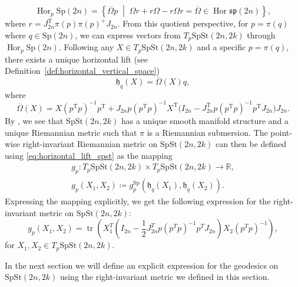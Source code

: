 %
\begin{equation*}
\operatorname{Hor}_{p}\mathrm{Sp}(2n)=\left\{ \overline{\Omega}p\;\middle|\;\Omega r+r\Omega-r\Omega r=\overline{\Omega}\in \operatorname{Hor}\mathfrak{sp}(2n) \right\},
\end{equation*}
%
where $r=J_{2n}^{\mathrm{T}}\pi(p)\pi (p)^+J_{2n}$. From this quotient perspective, for $p=\pi(q)$ where $q\in \mathrm{Sp}(2n)$, we can express vectors from $T_{p}\mathrm{SpSt}(2n, 2k)$ through $\operatorname{Hor}_{p}\mathrm{Sp}(2n)$. Following \cite[p.~5]{JensenZimmermann2024} any $X\in T_{p}\mathrm{SpSt}(2n, 2k)$ and a specific $p=\pi (q)$, there exists a unique horizontal lift (see Definition~\ref{def:horizontal_vertical_space})
%
\begin{equation}\label{eq:horizontal_lift_spst}
    \mathfrak{h}_{q}(X)=\overline{\Omega}(X)q,
\end{equation}
where
\begin{equation}\label{eq:bar_omega}
    \overline{\Omega}(X)=X(p^{\mathrm{T}}p)^{-1}p^{\mathrm{T}}+J_{2n}p(p^{\mathrm{T}}p)^{-1}X^{\mathrm{T}}\big(I_{2n}-J_{2n}^{\mathrm{T}}p(p^{\mathrm{T}}p)^{-1}p^{\mathrm{T}}J_{2n}\big)J_{2n}.
\end{equation}
%
By \cite[Thm.~2.28]{Lee2018}, we see that $\mathrm{SpSt}(2n, 2k)$ has a unique smooth manifold structure and a unique Riemannian metric such that $\pi$ is a Riemannian submersion. The point-wise right-invariant Riemannian metric on $\mathrm{SpSt}(2n, 2k)$ can then be defined using \eqref{eq:horizontal_lift_spst} as the mapping 
%
\begin{equation*}
    \begin{gathered}
        g_{p}\colon T_{p}\mathrm{SpSt}(2n, 2k)\times T_{p}\mathrm{SpSt}(2n, 2k)\xrightarrow{}\mathbb{R}, \\
        g_{p}(X_{1},X_{2})\coloneqq g^{\mathrm{Sp}}_{p}(\mathfrak{h}_{q}(X_{1}),\mathfrak{h}_{q}(X_{2})).
    \end{gathered}
\end{equation*}
%
Expressing the mapping explicitly, we get the following expression for the right-invariant metric on $\mathrm{SpSt}(2n, 2k)$:
\begin{equation}\label{eq:spst_metric}
    g_{p}(X_{1},X_{2})=\operatorname{tr}\left(X_{1}^{T}\left(I_{2n}- \frac{1}{2}J_{2n}^{T}p(p^{T}p)^{-1}p^{T}J_{2n}\right)X_{2}(p^{T}p)^{-1}\right),
\end{equation}
for $X_{1},X_{2}\in T_{p}\mathrm{SpSt}(2n, 2k)$.

In the next section we will define an explicit expression for the geodesics on $\mathrm{SpSt}(2n, 2k)$ using the right-invariant metric we defined in this section. 


